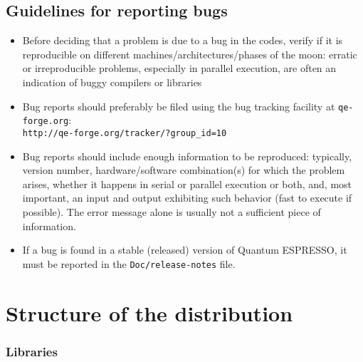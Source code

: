 \documentclass[12pt,a4paper]{article}
\def\qe{{\sc Quantum ESPRESSO}}
\def\qeforge{\texttt{qe-forge.org}}
\begin{document}
\subsection{Guidelines for reporting bugs}
\label{SubSec:Bugs}
\begin{itemize}
\item Before deciding that a problem is due to a bug in the codes, 
verify if it is reproducible on different machines/architectures/phases 
of the moon: erratic or irreproducible problems, especially in parallel
execution, are often an indication of buggy compilers or libraries
\item Bug reports should preferably be filed using the bug tracking 
facility at \qeforge:\\
\texttt{http://qe-forge.org/tracker/?group\_id=10}
\item Bug reports should include enough information to be reproduced: 
typically, version number, hardware/software combination(s) for which 
the problem arises, whether it happens in serial or parallel
execution or both, and, most important, an input and output
exhibiting such behavior (fast to execute if possible). The error
message alone is usually not a sufficient piece of information. 
\item If a bug is found in a stable (released) version of \qe, it must
be reported in the \texttt{Doc/release-notes} file.
\end{itemize}
\section{ Structure of the distribution}
\subsubsection{ Libraries}
\end{document}
